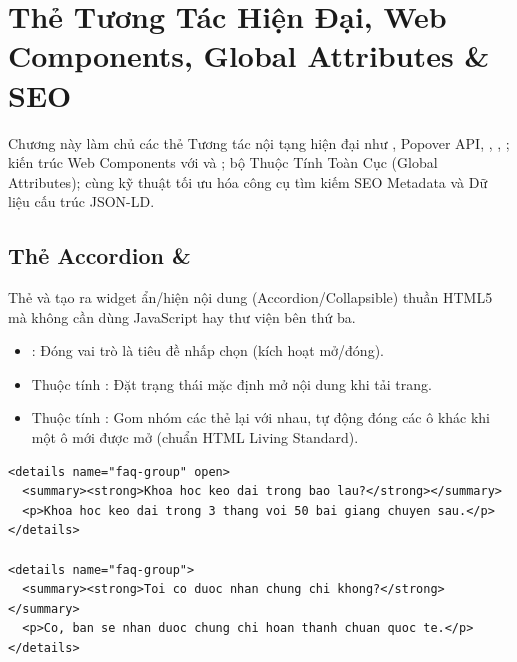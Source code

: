 \chapter{Thẻ Tương Tác Hiện Đại, Web Components, Global Attributes \& SEO}
\label{chap:modern_interactive_web_components}

Chương này làm chủ các thẻ Tương tác nội tạng hiện đại như , Popover API, , , ; kiến trúc Web Components với  và ; bộ Thuộc Tính Toàn Cục (Global Attributes); cùng kỹ thuật tối ưu hóa công cụ tìm kiếm SEO Metadata và Dữ liệu cấu trúc JSON-LD.

\section{Thẻ Accordion  \& }
\label{sec:details_summary}

\begin{conceptBox}
Thẻ  và  tạo ra widget ẩn/hiện nội dung (Accordion/Collapsible) thuần HTML5 mà không cần dùng JavaScript hay thư viện bên thứ ba.
\begin{itemize}[leftmargin=1.5em, itemsep=2pt, parsep=0pt]
    \item {}: Đóng vai trò là tiêu đề nhấp chọn (kích hoạt mở/đóng).
    \item Thuộc tính : Đặt trạng thái mặc định mở nội dung khi tải trang.
    \item Thuộc tính : Gom nhóm các thẻ  lại với nhau, tự động đóng các ô khác khi một ô mới được mở (chuẩn HTML Living Standard).
\end{itemize}
\end{conceptBox}

\begin{codeWindow}
\begin{lstlisting}[language=HTML5]
<details name="faq-group" open>
  <summary><strong>Khoa hoc keo dai trong bao lau?</strong></summary>
  <p>Khoa hoc keo dai trong 3 thang voi 50 bai giang chuyen sau.</p>
</details>

<details name="faq-group">
  <summary><strong>Toi co duoc nhan chung chi khong?</strong></summary>
  <p>Co, ban se nhan duoc chung chi hoan thanh chuan quoc te.</p>
</details>
\end{lstlisting}
\end{codeWindow}

